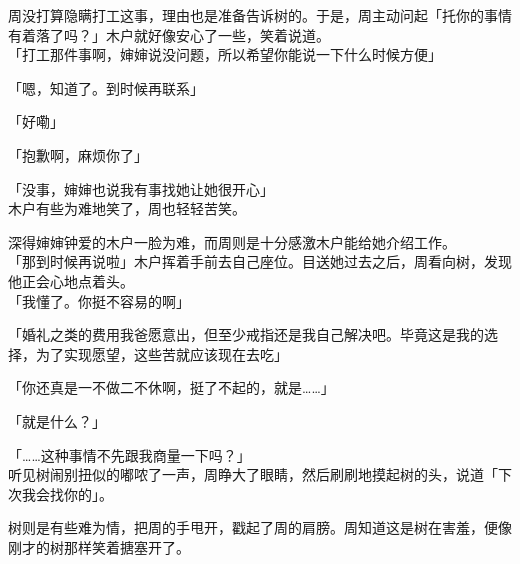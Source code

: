 周没打算隐瞒打工这事，理由也是准备告诉树的。于是，周主动问起「托你的事情有着落了吗？」木户就好像安心了一些，笑着说道。\\

「打工那件事啊，婶婶说没问题，所以希望你能说一下什么时候方便」

「嗯，知道了。到时候再联系」

「好嘞」

「抱歉啊，麻烦你了」

「没事，婶婶也说我有事找她让她很开心」\\

木户有些为难地笑了，周也轻轻苦笑。

深得婶婶钟爱的木户一脸为难，而周则是十分感激木户能给她介绍工作。\\

「那到时候再说啦」木户挥着手前去自己座位。目送她过去之后，周看向树，发现他正会心地点着头。\\

「我懂了。你挺不容易的啊」

「婚礼之类的费用我爸愿意出，但至少戒指还是我自己解决吧。毕竟这是我的选择，为了实现愿望，这些苦就应该现在去吃」

「你还真是一不做二不休啊，挺了不起的，就是……」

「就是什么？」

「……这种事情不先跟我商量一下吗？」\\

听见树闹别扭似的嘟哝了一声，周睁大了眼睛，然后刷刷地摸起树的头，说道「下次我会找你的」。

树则是有些难为情，把周的手甩开，戳起了周的肩膀。周知道这是树在害羞，便像刚才的树那样笑着搪塞开了。
